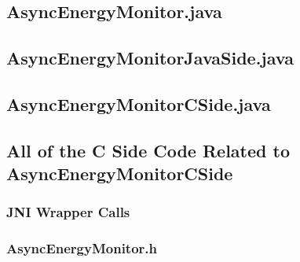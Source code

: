 \documentclass{article}
\begin{document}
\subsection{AsyncEnergyMonitor.java}
    \begin{framed}
        \lstset{language=java}
        
    \end{framed}
\subsection{AsyncEnergyMonitorJavaSide.java}
    \begin{framed}
        \lstset{language=java}
        
    \end{framed}
\subsection{AsyncEnergyMonitorCSide.java}
    \begin{framed}
        \lstset{language=java}
        
    \end{framed}
\subsection{All of the C Side Code Related to AsyncEnergyMonitorCSide}
    \subsubsection{JNI Wrapper Calls}
        \begin{framed}
            \lstset{language=C}
            
        \end{framed}
    \subsubsection{AsyncEnergyMonitor.h}
        \begin{framed}
            \lstset{language=C}
            
        \end{framed}
\end{document}
